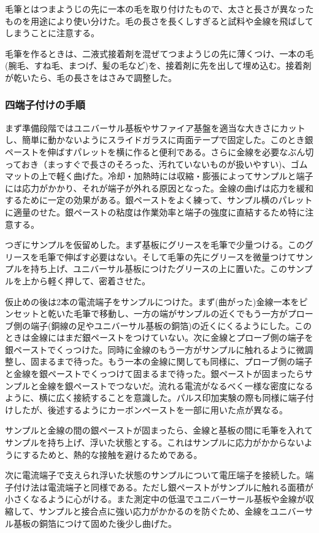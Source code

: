 毛筆とはつまようじの先に一本の毛を取り付けたもので、太さと長さが異なったものを用途により使い分けた。毛の長さを長くしすぎると試料や金線を飛ばしてしまうことに注意する。

毛筆を作るときは、二液式接着剤を混ぜてつまようじの先に薄くつけ、一本の毛(腕毛、すね毛、まつげ、髪の毛など)を、接着剤に先を出して埋め込む。接着剤が乾いたら、毛の長さをはさみで調整した。
 
\subsubsection{四端子付けの手順} 
まず準備段階ではユニバーサル基板やサファイア基盤を適当な大きさにカットし、簡単に動かないようにスライドガラスに両面テープで固定した。このとき銀ペーストを伸ばすパレットを横に作ると便利である。さらに金線を必要なぶん切っておき（まっすぐで長さのそろった、汚れていないものが扱いやすい)、ゴムマットの上で軽く曲げた。冷却・加熱時には収縮・膨張によってサンプルと端子には応力がかかり、それが端子が外れる原因となった。金線の曲げは応力を緩和するために一定の効果がある。銀ペーストをよく練って、サンプル横のパレットに適量のせた。銀ペーストの粘度は作業効率と端子の強度に直結するため特に注意する。
 
つぎにサンプルを仮留めした。まず基板にグリースを毛筆で少量つける。このグリースを毛筆で伸ばす必要はない。そして毛筆の先にグリースを微量つけてサンプルを持ち上げ、ユニバーサル基板につけたグリースの上に置いた。このサンプルを上から軽く押して、密着させた。
 
仮止めの後は2本の電流端子をサンプルにつけた。まず(曲がった)金線一本をピンセットと乾いた毛筆で移動し、一方の端がサンプルの近くでもう一方がプローブ側の端子(銅線の足やユニバーサル基板の銅箔)の近くにくるようにした。このときは金線にはまだ銀ペーストをつけていない。次に金線とプローブ側の端子を銀ペーストでくっつけた。同時に金線のもう一方がサンプルに触れるように微調整し、固まるまで待った。もう一本の金線に関しても同様に、プローブ側の端子と金線を銀ペーストでくっつけて固まるまで待った。銀ペーストが固まったらサンプルと金線を銀ペーストでつないだ。流れる電流がなるべく一様な密度になるように、横に広く接続することを意識した。パルス印加実験の際も同様に端子付けしたが、後述するようにカーボンペーストを一部に用いた点が異なる。
 
サンプルと金線の間の銀ペーストが固まったら、金線と基板の間に毛筆を入れてサンプルを持ち上げ、浮いた状態とする。これはサンプルに応力がかからないようにするためと、熱的な接触を避けるためである。
 
次に電流端子で支えられ浮いた状態のサンプルについて電圧端子を接続した。端子付け法は電流端子と同様である。ただし銀ペーストがサンプルに触れる面積が小さくなるように心がける。また測定中の低温でユニバーサール基板や金線が収縮して、サンプルと接合点に強い応力がかかるのを防ぐため、金線をユニバーサル基板の銅箔につけて固めた後少し曲げた。

